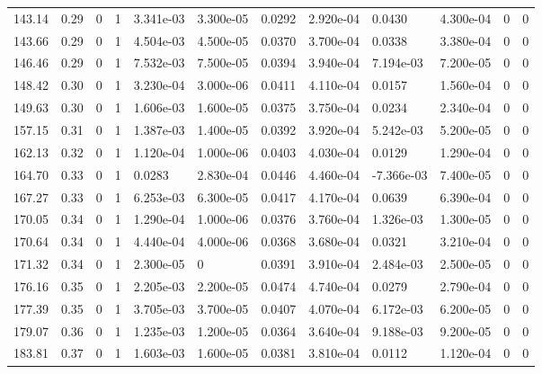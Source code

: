 \documentclass[preview]{standalone}
\begin{document}
{{{{{{{{{{{{{\begin{tabular}{L{1.2cm}C{1.2cm} C{0.3cm}C{0.5cm} C{1.4cm}C{1.4cm} C{1.4cm}C{1.4cm} C{1.6cm}C{1.6cm} C{1.6cm}C{1.6cm}}
  143.14  &  0.29  & 0     &  1 &  3.341e-03  & 3.300e-05  &  0.0292&   2.920e-04& 0.0430 & 4.300e-04   &  0 & 0  \\ 
  143.66  &  0.29  & 0     &  1 &  4.504e-03  & 4.500e-05  &  0.0370&   3.700e-04& 0.0338 & 3.380e-04   &  0 & 0  \\ 
  146.46  &  0.29  & 0     &  1 &  7.532e-03  & 7.500e-05  &  0.0394&   3.940e-04& 7.194e-03 & 7.200e-05   &  0 & 0  \\ 
  148.42  &  0.30  & 0     &  1 &  3.230e-04  & 3.000e-06  &  0.0411&   4.110e-04& 0.0157 & 1.560e-04   &  0 & 0  \\ 
  149.63  &  0.30  & 0     &  1 &  1.606e-03  & 1.600e-05  &  0.0375&   3.750e-04& 0.0234 & 2.340e-04   &  0 & 0  \\ 
  157.15  &  0.31  & 0     &  1 &  1.387e-03  & 1.400e-05  &  0.0392&   3.920e-04& 5.242e-03 & 5.200e-05   &  0 & 0  \\ 
  162.13  &  0.32  & 0     &  1 &  1.120e-04  & 1.000e-06  &  0.0403&   4.030e-04& 0.0129 & 1.290e-04   &  0 & 0  \\ 
  164.70  &  0.33  & 0     &  1 &  0.0283  & 2.830e-04  &  0.0446&   4.460e-04& -7.366e-03 & 7.400e-05   &  0 & 0  \\ 
  167.27  &  0.33  & 0     &  1 &  6.253e-03  & 6.300e-05  &  0.0417&   4.170e-04& 0.0639 & 6.390e-04   &  0 & 0  \\ 
  170.05  &  0.34  & 0     &  1 &  1.290e-04  & 1.000e-06  &  0.0376&   3.760e-04& 1.326e-03 & 1.300e-05   &  0 & 0  \\ 
  170.64  &  0.34  & 0     &  1 &  4.440e-04  & 4.000e-06  &  0.0368&   3.680e-04& 0.0321 & 3.210e-04   &  0 & 0  \\ 
  171.32  &  0.34  & 0     &  1 &  2.300e-05  & 0  &  0.0391&   3.910e-04& 2.484e-03 & 2.500e-05   &  0 & 0  \\ 
  176.16  &  0.35  & 0     &  1 &  2.205e-03  & 2.200e-05  &  0.0474&   4.740e-04& 0.0279 & 2.790e-04   &  0 & 0  \\ 
  177.39  &  0.35  & 0     &  1 &  3.705e-03  & 3.700e-05  &  0.0407&   4.070e-04& 6.172e-03 & 6.200e-05   &  0 & 0  \\ 
  179.07  &  0.36  & 0     &  1 &  1.235e-03  & 1.200e-05  &  0.0364&   3.640e-04& 9.188e-03 & 9.200e-05   &  0 & 0  \\ 
  183.81  &  0.37  & 0     &  1 &  1.603e-03  & 1.600e-05  &  0.0381&   3.810e-04& 0.0112 & 1.120e-04   &  0 & 0  \\ 
\hline 
\end{tabular} 

}}}}}}}}}}}}}
\end{document}
